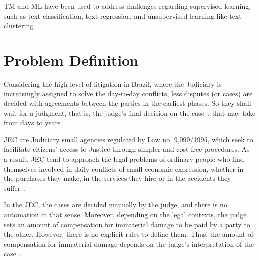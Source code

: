 \gls{TM} and \gls{ML} have been used to address challenges regarding supervised learning, such as text classification,  text regression, and unsupervised learning like text clustering~\cite{Aggarwal2013, Trusov2016, Medvedeva2019, Zhang2019}. 



\section{Problem Definition} %



Considering the high level of litigation in Brazil, where the Judiciary is increasingly assigned  to solve the day-to-day conflicts, less disputes (or cases) are decided with agreements between the parties in the earliest phases. So they shall wait for a judgment, that is, the judge's final  decision on the case~\cite{DictJudgment2021}, that may take from days to years~\cite{Cury2019, Mancuso2020}.


\gls{JEC} are Judiciary small agencies regulated by Law no. 9,099/1995, which seek to facilitate citizens' access to Justice through simpler and cost-free procedures. As a result, \gls{JEC} tend to approach the legal problems of ordinary people who find themselves involved in daily conflicts of small economic expression, whether in the purchases they make, in the services they hire or in the accidents they suffer~\cite{Watanabe1985}.


In the  \gls{JEC}, the cases are decided manually by the judge, and there is no automation in that sense. %
Moreover, depending on the legal contexts,  the judge sets an amount of compensation for immaterial damage to be paid by a party to the other. However, there is no explicit rules to define them.  Thus, the amount of compensation for immaterial damage depends on the judge's interpretation of the case~\cite{Sadiku2020}. 

